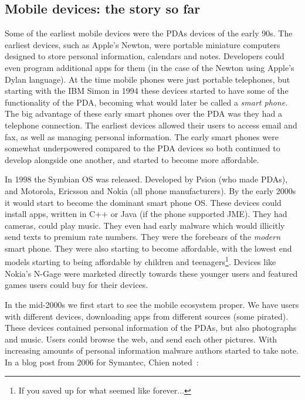 \documentclass[thesis.tex]{subfiles}
\begin{document}
\subsection{Mobile devices: the story so far}

Some of the earliest mobile devices were the \acp{PDA} devices of the
early 90s.  The earliest devices, such as Apple's Newton, were
portable miniature computers designed to store personal information,
calendars and notes.  Developers could even program additional apps
for them (in the case of the Newton using Apple's Dylan language).  At
the time mobile phones were just portable telephones, but starting
with the IBM Simon in 1994 these devices started to have some of the
functionality of the \ac{PDA}, becoming what would later be called a
\emph{smart phone}.  The big advantage of these early smart phones
over the \ac{PDA} was they had a telephone connection.  The earliest
devices allowed their users to access email and fax, as well as
managing personal information.  The early smart phones were somewhat
underpowered compared to the \ac{PDA} devices so both continued to
develop alongside one another, and started to become more affordable.

In 1998 the Symbian OS was released.  Developed by Psion (who made
\acp{PDA}), and Motorola, Ericsson and Nokia (all phone
manufacturers).  By the early 2000s it would start to become the
dominant smart phone OS.  These devices could install apps, written in
C++ or Java (if the phone supported JME). They had cameras, could play
music. They even had early malware which would illicitly send texts to
premium rate numbers.  They were the forebears of the \emph{modern}
smart phone.
They were also starting to become affordable, with the lowest end
models starting to being affordable by children and
teenagers\footnote{If you saved up for what seemed like
  forever$\ldots$}.  Devices like Nokia's N-Gage were marketed directly
towards these younger users and featured games users could buy for
their devices.

In the mid-2000s we first start to see the mobile
ecosystem proper.  We have users with different devices, downloading
apps from different sources (some pirated).  These devices
contained personal information of the \acp{PDA}, but also photographs
and music.  Users could browse the web, and send each other pictures.
With increasing amounts of personal information malware authors
started to take note.  In a blog post from 2006 for Symantec, Chien
noted~\cite{eric_chien_spyware_2006}:
\end{document}
